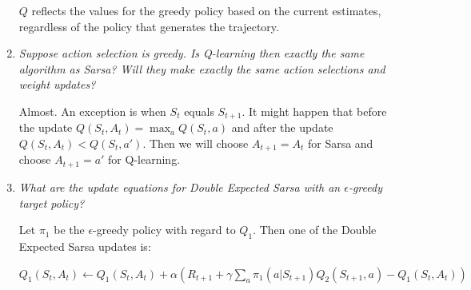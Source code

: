 \documentclass[12pt,a4paper]{article}
\begin{document}
\begin{enumerate}
$Q$ reflects the values for the greedy policy based on the current estimates, regardless of the
policy that generates the trajectory.

\item
\textit{Suppose action selection is greedy. Is Q-learning then exactly the same
algorithm as Sarsa? Will they make exactly the same action selections and weight
updates?}

Almost. An exception is when $S_t$ equals $S_{t + 1}$. It might happen
that before the update $Q(S_t, A_t) = \max_aQ(S_t, a)$ and
after the update $Q(S_t, A_t) < Q(S_t, a')$. Then we will choose $A_{t + 1} = A_t$ for
Sarsa and choose $A_{t + 1} = a'$ for Q-learning.

\item
\textit{What are the update equations for Double Expected Sarsa with an
$\epsilon$-greedy target policy?}

Let $\pi_1$ be the $\epsilon$-greedy policy with regard to $Q_1$. Then one of
the Double Expected Sarsa updates is:

$Q_1(S_t, A_t) \leftarrow Q_1(S_t, A_t) + \alpha(R_{t + 1} + \gamma \sum\limits_a \pi_1(a | S_{t + 1 })Q_2(S_{t + 1}, a) - Q_1(S_t, A_t))$

\end{enumerate}
\end{document}
